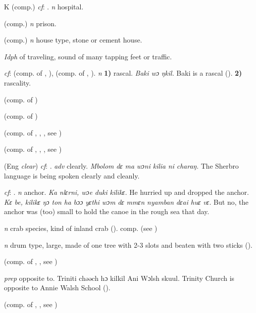 \begin{letter}{K}
 (comp.) \textit{cf}: . \textit{n} hospital.

 (comp.) \textit{n} prison.

 (comp.) \textit{n} house type, stone or cement house. 

 \textit{Idph} of traveling, sound of many tapping feet or traffic. 

 \textit{cf}:  (comp. of , ),  (comp. of , ). \textit{n} \textbf{1)} rascal. \textit{Baki wɔ ŋkil.} Baki is a rascal (\citealt{Pichl1967}). \textbf{2)} rascality.

 (comp. of ) 

 (comp. of ) 

 (comp. of , , , see ) 

 (comp. of , , , see ) 

 (Eng \textit{clear}) \textit{cf}: . \textit{adv} clearly. \textit{Mbolom dɛ ma wɔni kilia ni charaŋ.} The Sherbro language is being spoken clearly and cleanly.

 \textit{cf}: . \textit{n} anchor. \textit{Ka nlɛrni, wɔe duki kilikɛ.} He hurried up and dropped the anchor. \textit{Kɛ be, kilikɛ ŋɔ ton ha bɔɔ yɛthi wɔm dɛ mmɛn nyamban dɛai huɛ vɛ.} But no, the anchor was (too) small to hold the canoe in the rough sea that day.

 \textit{n} crab species, kind of inland crab (\citealt{Pichl1967}). comp.  (see ) 

 \textit{n} drum type, large, made of one tree with 2-3 slots and beaten with two sticks (\citealt{Pichl1967}). 

 (comp. of , , see ) 

 \textit{prep} opposite to. Triniti chəəch hɔ kilkil Ani Wɔlsh skuul. Trinity Church is opposite to Annie Walsh School (\citealt{Pichl1967}). 

 (comp. of , , see ) 


\end{letter}
